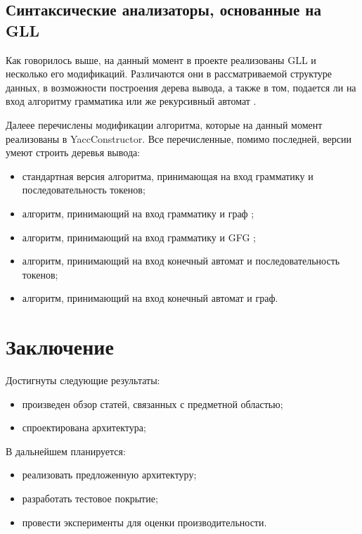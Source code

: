 \documentclass[14pt]{matmex-diploma}
\begin{document}
\subsection{Синтаксические анализаторы, основанные на GLL}
Как говорилось выше, на данный момент в проекте реализованы GLL и несколько его модификаций. Различаются они в рассматриваемой структуре данных, в возможности построения дерева вывода, а также в том, подается ли на вход алгоритму грамматика или же рекурсивный автомат \cite{RADesc}. 

Далеее перечислены модификации алгоритма, которые на данный момент реализованы в YaccConstructor. Все перечисленные, помимо последней, версии умеют строить деревья вывода:
\begin{itemize}
    \item стандартная версия алгоритма, принимающая на вход грамматику и последовательность токенов;
    \item алгоритм, принимающий на вход грамматику и граф ;
    \item алгоритм, принимающий на вход грамматику и GFG \cite{GFGDesc};
    \item алгоритм, принимающий на вход конечный автомат и последовательность токенов;
    \item алгоритм, принимающий на вход конечный автомат и граф.
\end{itemize}

\section{Заключение}
Достигнуты следующие результаты:
\begin{itemize}
    \item произведен обзор статей, связанных с предметной областью;
    \item спроектирована архитектура;
\end{itemize}
В дальнейшем планируется:
\begin{itemize}
    \item реализовать предложенную архитектуру;
    \item разработать тестовое покрытие;
    \item провести эксперименты для оценки производительности.
\end{itemize}


\setmonofont[Mapping=tex-text]{CMU Typewriter Text}


\end{document}
